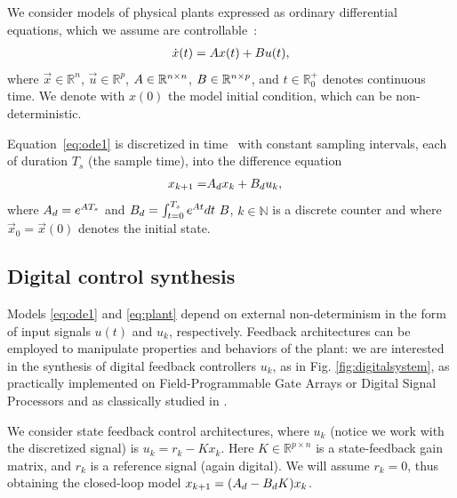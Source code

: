 We consider models of physical plants expressed as ordinary differential
equations, which we assume are controllable~\cite{Astrom08}: 
%
\begin{align}
\label{eq:ode1}
\dot{x}(t) = {A}{x}(t)+ {B} {u}(t), 
\end{align}
%
where 
$\vec{x} \in \mathbb{R}^n$,  
$\vec{u} \in \mathbb{R}^p$, 
${A} \in \mathbb{R}^{n \times n}$, 
${B} \in \mathbb{R}^{n \times p}$,
and $t \in \mathbb R_0^+$ denotes continuous time. 
We denote with $x(0)$ the model initial condition, which can be non-deterministic. 

Equation~\eqref{eq:ode1} is 
discretized in time~\cite{middleton1990digital,van1978computing} with constant sampling intervals, 
each of duration $T_s$ (the sample time), 
into the difference equation
%
\begin{align}
\label{eq:plant}
{x}_{k+1} =& {A}_d {x}_k+ {B}_d {u}_k, 
\end{align} 
where 
${A}_d=e^{{A}T_s}$ and 
$\mat{B}_d = \int_{t = 0}^{T_s} e^{\mat{A} t} dt\ \mat{B}$, 
$k \in \mathbb N$ is a discrete counter and where $\vec{x}_{0}=\vec{x}(0)$ denotes the initial state.

\subsection{Digital control synthesis}

Models \eqref{eq:ode1} and \eqref{eq:plant} depend on external non-determinism in the form of input signals $u (t)$ and  $u_k$, respectively. 
Feedback architectures can be employed to manipulate properties and behaviors of the plant:    
we are interested in the synthesis of digital feedback controllers $u_k$, as in Fig. \ref{fig:digitalsystem},  
as practically implemented on Field-Programmable Gate Arrays or Digital Signal Processors   
and as classically studied in \cite{astrom1997computer}. 

We consider state feedback control architectures, 
where $u_k$ (notice we work with the discretized signal) is $u_k = r_{k} - K x_k$. 
Here $K \in \mathbb{R}^{p \times n}$ is a state-feedback gain matrix, 
and $r_{k}$ is a reference signal (again digital). 
We will assume $r_k=0$, thus obtaining the closed-loop model 
${x}_{k+1}=({A}_d-{B}_d{K}){x}_k$. 


